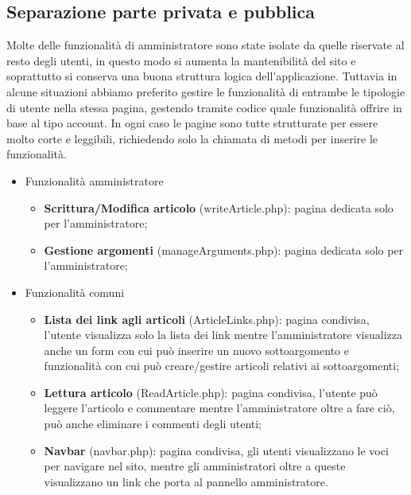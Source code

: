 \documentclass[12pt]{article}
\begin{document}
	\subsection{Separazione parte privata e pubblica}
	Molte delle funzionalità di amministratore sono state isolate da quelle riservate al resto degli utenti, in questo modo si aumenta la mantenibilità del sito e soprattutto si conserva una buona struttura logica dell'applicazione. Tuttavia in alcune situazioni abbiamo preferito gestire le funzionalità di entrambe le tipologie di utente nella stessa pagina, gestendo tramite codice quale funzionalità offrire in base al tipo account. In ogni caso le pagine sono tutte strutturate per essere molto corte e leggibili, richiedendo solo la chiamata di metodi per inserire le funzionalità.
	\begin{itemize}
		\item Funzionalità amministratore
			\begin{itemize}
				\item \textbf{Scrittura/Modifica articolo} (writeArticle.php): pagina dedicata solo per l'amministratore;
				\item \textbf{Gestione argomenti} (manageArguments.php): pagina dedicata solo per l'amministratore;
			\end{itemize}
		\item Funzionalità comuni
			\begin{itemize}
				\item \textbf{Lista dei link agli articoli} (ArticleLinks.php): pagina condivisa, l'utente visualizza solo la lista dei link mentre l'amministratore visualizza anche un form con cui può inserire un nuovo sottoargomento e funzionalità con cui può creare/gestire articoli relativi ai sottoargomenti;
				\item \textbf{Lettura articolo} (ReadArticle.php): pagina condivisa, l'utente può leggere l'articolo e commentare mentre l'amministratore oltre a fare ciò, può anche eliminare i commenti degli utenti;
				\item \textbf{Navbar} (navbar.php): pagina condivisa, gli utenti visualizzano le voci per navigare nel sito, mentre gli amministratori oltre a queste visualizzano un link che porta al pannello amministratore.
			\end{itemize}
	\end{itemize}
\end{document}

